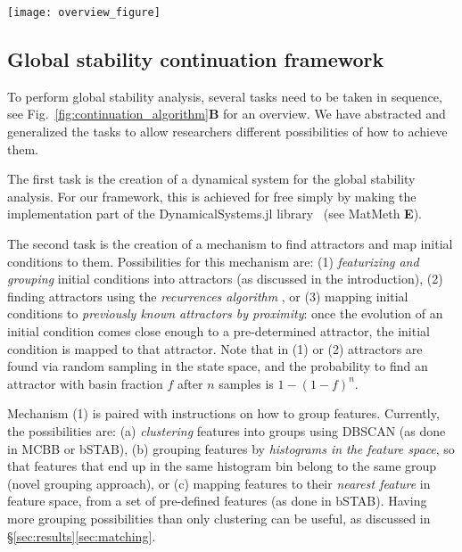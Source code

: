 \documentclass[9pt,twocolumn,twoside,lineno]{pnas-new}
\begin{document}
\begin{figure*}%
\centering 
\texttt{[image: overview\_figure]}
\caption{\textbf{A}: The recurrences-based seed-and-match algorithm for global stability continuation described in \S\ref{sec:results}\ref{sec:recurrences_continuation}.
\textbf{B}: Schematic illustration of the modular framework for global stability analysis and continuation described in \S\ref{sec:results}\ref{sec:framework}.}
\label{fig:continuation_algorithm}
\end{figure*}



\subsection{Global stability continuation framework}
\label{sec:framework}
To perform global stability analysis, several tasks need to be taken in sequence, see Fig.~\ref{fig:continuation_algorithm}\textbf{B} for an overview. We have abstracted and generalized the tasks to allow researchers different possibilities of how to achieve them. 

The first task is the creation of a dynamical system for the global stability analysis. For our framework, this is achieved for free simply by making the implementation part of the DynamicalSystems.jl library~\cite{DynamicalSystems.jl} (see MatMeth \textbf{E}).

The second task is the creation of a mechanism to find attractors and map initial conditions to them. Possibilities for this mechanism are: (1) \emph{featurizing and grouping} initial conditions into attractors (as discussed in the introduction), (2) finding attractors using the \emph{recurrences algorithm} \cite{DatserisWagemakers2022}, or (3) mapping initial conditions to \emph{previously known attractors by proximity}: once the evolution of an initial condition comes close enough to a pre-determined attractor, the initial condition is mapped to that attractor. Note that in (1) or (2) attractors are found via random sampling in the state space, and the probability to find an attractor with basin fraction $f$ after $n$ samples is $1 - (1 - f)^n$.

Mechanism (1) is paired with instructions on how to group features. Currently, the possibilities are: (a) \emph{clustering} features into groups using DBSCAN (as done in MCBB or bSTAB), (b) grouping features by \emph{histograms in the feature space}, so that features that end up in the same histogram bin belong to the same group (novel grouping approach), or (c) mapping features to their \emph{nearest feature} in feature space, from a set of pre-defined features (as done in bSTAB). Having more grouping possibilities than only clustering can be useful, as discussed in \S\ref{sec:results}\ref{sec:matching}.
\end{document}
